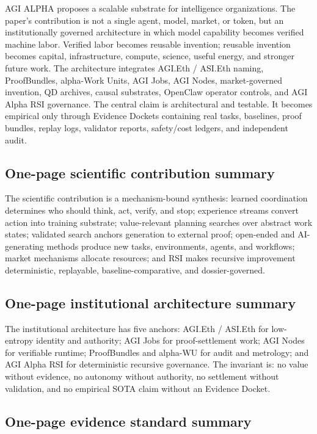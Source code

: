 \documentclass[
  11pt,
]{article}
\begin{document}
AGI ALPHA proposes a scalable substrate for intelligence organizations.
The paper's contribution is not a single agent, model, market, or token,
but an institutionally governed architecture in which model capability
becomes verified machine labor. Verified labor becomes reusable
invention; reusable invention becomes capital, infrastructure, compute,
science, useful energy, and stronger future work. The architecture
integrates AGI.Eth / ASI.Eth naming, ProofBundles, alpha-Work Units, AGI
Jobs, AGI Nodes, market-governed invention, QD archives, causal
substrates, OpenClaw operator controls, and AGI Alpha RSI governance.
The central claim is architectural and testable. It becomes empirical
only through Evidence Dockets containing real tasks, baselines, proof
bundles, replay logs, validator reports, safety/cost ledgers, and
independent audit.

\subsection{One-page scientific contribution
summary}\label{one-page-scientific-contribution-summary}

The scientific contribution is a mechanism-bound synthesis: learned
coordination determines who should think, act, verify, and stop;
experience streams convert action into training substrate;
value-relevant planning searches over abstract work states; validated
search anchors generation to external proof; open-ended and
AI-generating methods produce new tasks, environments, agents, and
workflows; market mechanisms allocate resources; and RSI makes recursive
improvement deterministic, replayable, baseline-comparative, and
dossier-governed.

\subsection{One-page institutional architecture
summary}\label{one-page-institutional-architecture-summary}

The institutional architecture has five anchors: AGI.Eth / ASI.Eth for
low-entropy identity and authority; AGI Jobs for proof-settlement work;
AGI Nodes for verifiable runtime; ProofBundles and alpha-WU for audit
and metrology; and AGI Alpha RSI for deterministic recursive governance.
The invariant is: no value without evidence, no autonomy without
authority, no settlement without validation, and no empirical SOTA claim
without an Evidence Docket.

\subsection{One-page evidence standard
summary}\label{one-page-evidence-standard-summary}
\end{document}
